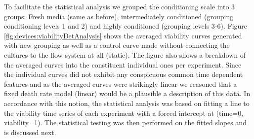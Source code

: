     To facilitate the statistical analysis we grouped the conditioning scale into 3 groups: Fresh media (same as before), intermediately conditioned (grouping conditioning levels 1 and 2) and highly conditioned (grouping levels 3-6). Figure \ref{fig:devices:viabilityDetAnalysis} shows the averaged viability curves generated with new grouping as well as a control curve made without connecting the cultures to the flow system at all (static). The figure also shows a breakdown of the averaged curves into the constituent individual ones per experiment. Since the individual curves did not exhibit any conspicuous common time dependent features and as the averaged curves were strikingly linear we reasoned that a fixed death rate model (linear) would be a plausible a description of this data. In accordance with this notion, the statistical analysis was based on fitting a line to the viability time series of each experiment with a forced intercept at (time=0, viability=1). The statistical testing was then performed on the fitted slopes and is discussed next.

